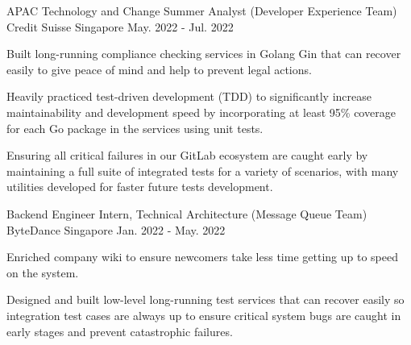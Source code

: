 

\begin{cventries}
  \cventry
    {APAC Technology and Change Summer Analyst (Developer Experience Team)} %
    {Credit Suisse} %
    {Singapore} %
    {May. 2022 - Jul. 2022} %
    {
      \begin{cvitems} %
        \item {Built long-running compliance checking services in Golang Gin that can recover easily to give peace of mind and help to prevent legal actions.}
        \item {Heavily practiced test-driven development (TDD) to significantly increase maintainability and development speed by incorporating at least 95\% coverage for each Go package in the services using unit tests.}
        \item {Ensuring all critical failures in our GitLab ecosystem are caught early by maintaining a full suite of integrated tests for a variety of scenarios, with many utilities developed for faster future tests development.}
      \end{cvitems}
    }

  \cventry
    {Backend Engineer Intern, Technical Architecture (Message Queue Team)} %
    {ByteDance} %
    {Singapore} %
    {Jan. 2022 - May. 2022} %
    {
      \begin{cvitems} %
        \item {Enriched company wiki to ensure newcomers take less time getting up to speed on the system.}
        \item {Designed and built low-level long-running test services that can recover easily so integration test cases are always up to ensure critical system bugs are caught in early stages and prevent catastrophic failures.}
      \end{cvitems}
    }


\end{cventries}
